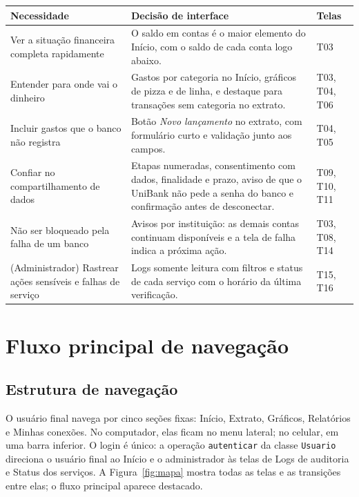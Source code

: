 \documentclass[11pt,a4paper]{article}
\newcommand{\hd}[1]{\cellcolor{headfill}\textbf{#1}}
\newcommand{\cls}[1]{\texttt{#1}}
\begin{document}
\begin{tabularx}{\linewidth}{|L{4.3cm}|Y|L{1.9cm}|}
\hline
\hd{Necessidade} & \hd{Decisão de interface} & \hd{Telas} \\ \hline
Ver a situação financeira completa rapidamente & O saldo em contas é o maior elemento do Início, com o saldo de cada conta logo abaixo. & T03 \\ \hline
Entender para onde vai o dinheiro & Gastos por categoria no Início, gráficos de pizza e de linha, e destaque para transações sem categoria no extrato. & T03, T04, T06 \\ \hline
Incluir gastos que o banco não registra & Botão \emph{Novo lançamento} no extrato, com formulário curto e validação junto aos campos. & T04, T05 \\ \hline
Confiar no compartilhamento de dados & Etapas numeradas, consentimento com dados, finalidade e prazo, aviso de que o UniBank não pede a senha do banco e confirmação antes de desconectar. & T09, T10, T11 \\ \hline
Não ser bloqueado pela falha de um banco & Avisos por instituição: as demais contas continuam disponíveis e a tela de falha indica a próxima ação. & T03, T08, T14 \\ \hline
(Administrador) Rastrear ações sensíveis e falhas de serviço & Logs somente leitura com filtros e status de cada serviço com o horário da última verificação. & T15, T16 \\ \hline
\end{tabularx}

\section{Fluxo principal de navegação}
\label{sec:fluxo}

\subsection{Estrutura de navegação}

O usuário final navega por cinco seções fixas: Início, Extrato, Gráficos, Relatórios e Minhas conexões. No computador, elas ficam no menu lateral; no celular, em uma barra inferior. O login é único: a operação \cls{autenticar} da classe \cls{Usuario} direciona o usuário final ao Início e o administrador às telas de Logs de auditoria e Status dos serviços. A Figura~\ref{fig:mapa} mostra todas as telas e as transições entre elas; o fluxo principal aparece destacado.
\end{document}
